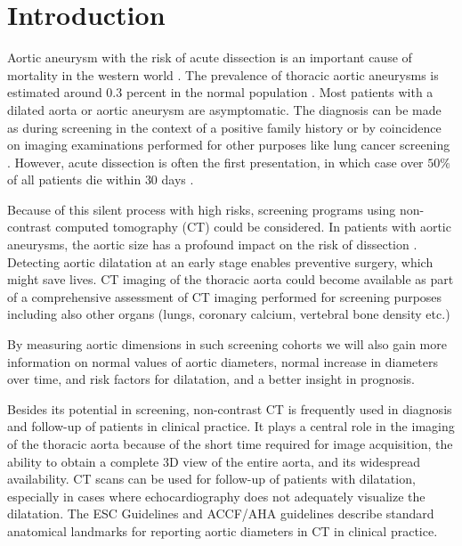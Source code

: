 \section{Introduction}
Aortic aneurysm with the risk of acute dissection is an important cause of mortality in the western world \autocite{roth2015global}. The prevalence of thoracic aortic aneurysms is estimated around $0.3$ percent in the normal population \autocite{itani2002measurement, kalsch2013body}. Most patients with a dilated aorta or aortic aneurysm are asymptomatic. The diagnosis can be made as during screening in the context of a positive family history or by coincidence on imaging examinations performed for other purposes like lung cancer screening \autocite{mets2012computed}. However, acute dissection is often the first presentation, in which case over $50\%$ of all patients die within $30$ days \autocite{melvinsdottir2016incidence}.


Because of this silent process with high risks, screening programs using non-contrast computed tomography (CT) could be considered. In patients with aortic aneurysms, the aortic size has a profound impact on the risk of dissection \autocite{davies2006novel,kim2015risk}. Detecting aortic dilatation at an early stage enables preventive surgery, which might save lives. CT imaging of the thoracic aorta could become available as part of a comprehensive assessment of CT imaging performed for screening purposes including also other organs (lungs,  coronary calcium, vertebral bone density etc.) \autocite{mets2012computed}


By measuring aortic dimensions in such screening cohorts we will also gain more information on normal values of aortic diameters, normal increase in diameters over time, and risk factors for dilatation, and a better insight in prognosis. 

Besides its potential in screening, non-contrast CT is frequently used in diagnosis and follow-up of patients in clinical practice. It plays a central role in the imaging of the thoracic aorta because of the short time required for image acquisition, the ability to obtain a complete 3D view of the entire aorta, and its widespread availability. CT scans can be used for follow-up of patients with dilatation, especially in cases where echocardiography does not adequately visualize the dilatation. The ESC Guidelines and ACCF/AHA guidelines \autocite{american20102010, erbel2014esc} describe standard anatomical landmarks for reporting aortic diameters in CT in clinical practice. 

